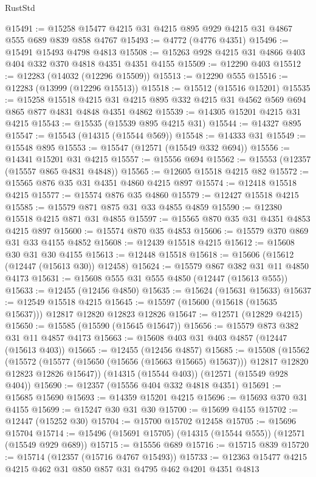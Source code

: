 \begin{lexlean}{RustStd}
\begin{coremodule}
@15491 := @15258 @15477 @4215 @31 @4215 @895 @929 @4215 @31 @4867 @555 @689 @839 @858 @4767
@15493 := @4772 (@4776 @4351)
@15496 := @15491 @15493 @4798 @4813
@15508 := @15263 @928 @4215 @31 @4866 @403 @404 @332 @370 @4818 @4351 @4351 @4155
@15509 := @12290 @403
@15512 := @12283 (@14032 (@12296 @15509))
@15513 := @12290 @555
@15516 := @12283 (@13999 (@12296 @15513))
@15518 := @15512 (@15516 @15201)
@15535 := @15258
    @15518
    @4215
    @31
    @4215
    @895
    @332
    @4215
    @31
    @4562
    @569
    @694
    @865
    @877
    @4831
    @4848
    @4351
    @4862
@15539 := @14305 @15201 @4215 @31 @4215
@15543 := @15535 (@15539 @895 @4215 @31)
@15544 := @14327 @895
@15547 := @15543 (@14315 (@15544 @569))
@15548 := @14333 @31
@15549 := @15548 @895
@15553 := @15547 (@12571 (@15549 @332 @694))
@15556 := @14341 @15201 @31 @4215
@15557 := @15556 @694
@15562 := @15553 (@12357 (@15557 @865 @4831 @4848))
@15565 := @12605 @15518 @4215 @82
@15572 := @15565 @876 @35 @31 @4351 @4860 @4215 @897
@15574 := @12418 @15518 @4215
@15577 := @15574 @876 @35 @4860
@15579 := @12427 @15518 @4215
@15585 := @15579 @871 @875 @31 @33 @4855 @4859
@15590 := @12380 @15518 @4215 @871 @31 @4855
@15597 := @15565 @870 @35 @31 @4351 @4853 @4215 @897
@15600 := @15574 @870 @35 @4853
@15606 := @15579 @370 @869 @31 @33 @4155 @4852
@15608 := @12439 @15518 @4215
@15612 := @15608 @30 @31 @30 @4155
@15613 := @12448 @15518
@15618 := @15606 (@15612 (@12447 (@15613 @30)) @12458)
@15624 := @15579 @867 @382 @31 @11 @4850 @4173
@15631 := @15608 @555 @31 @555 @4850 (@12447 (@15613 @555))
@15633 := @12455 (@12456 @4850)
@15635 := @15624 (@15631 @15633)
@15637 := @12549 @15518 @4215
@15645 := @15597 (@15600 (@15618 (@15635 @15637))) @12817 @12820 @12823 @12826
@15647 := @12571 (@12829 @4215)
@15650 := @15585 (@15590 (@15645 @15647))
@15656 := @15579 @873 @382 @31 @11 @4857 @4173
@15663 := @15608 @403 @31 @403 @4857 (@12447 (@15613 @403))
@15665 := @12455 (@12456 @4857)
@15685 := @15508
    (@15562
      (@15572 (@15577 (@15650 (@15656 (@15663 @15665) @15637))) @12817 @12820 @12823 @12826 @15647))
    (@14315 (@15544 @403))
    (@12571 (@15549 @928 @404))
@15690 := @12357 (@15556 @404 @332 @4818 @4351)
@15691 := @15685 @15690
@15693 := @14359 @15201 @4215
@15696 := @15693 @370 @31 @4155
@15699 := @15247 @30 @31 @30
@15700 := @15699 @4155
@15702 := @12447 (@15252 @30)
@15704 := @15700 @15702 @12458
@15705 := @15696 @15704
@15714 := @15496 (@15691 @15705) (@14315 (@15544 @555)) (@12571 (@15549 @929 @689))
@15715 := @15556 @689
@15716 := @15715 @839
@15720 := @15714 (@12357 (@15716 @4767 @15493))
@15733 := @12363 @15477 @4215 @4215 @462 @31 @850 @857 @31 @4795 @462 @4201 @4351 @4813

\end{coremodule}
\end{lexlean}
